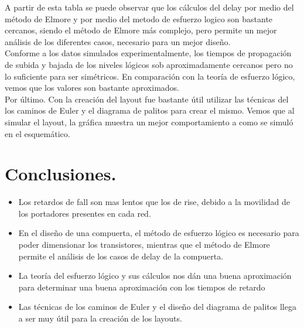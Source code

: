 \documentclass[12pt,a4paper]{article} %
\begin{document}
A partir de esta tabla se puede observar que los cálculos del delay por medio del método de Elmore y por medio del metodo de esfuerzo logico son bastante cercanos, siendo el método de Elmore más complejo, pero permite un mejor análisis de los diferentes casos, necesario para un mejor diseño.\\

Conforme a los datos simulados experimentalmente, los tiempos de propagación de subida y bajada de los niveles lógicos sob aproximadamente cercanos pero no lo suficiente para ser simétricos. En comparación con la teoría de esfuerzo lógico, vemos que los valores son bastante aproximados.\\

Por último. Con la creación del layout fue bastante útil utilizar las técnicas del los caminos de Euler y el diagrama de palitos para crear el mismo. Vemos que al simular el layout, la gráfica muestra un mejor comportamiento a como se simuló en el esquemático.




\section{Conclusiones.}
\begin{itemize}
\item Los retardos de fall son mas lentos que los de rise, debido a la movilidad de los portadores presentes en cada red.
\item En el diseño de una compuerta, el método de esfuerzo lógico es necesario para poder dimensionar los transistores, mientras que el método de Elmore permite el análisis de los casos de delay de la compuerta.
\item La teoría del esfuerzo lógico y sus cálculos nos dán una buena aproximación para determinar una buena aproximación con los tiempos de retardo
\item Las técnicas de los caminos de Euler y el diseño del diagrama de palitos llega a ser muy útil para la creación de los layouts.

\end{itemize}
\end{document}
